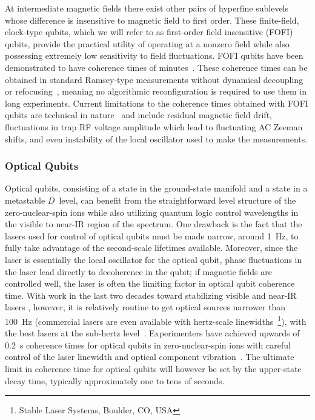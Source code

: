 \documentclass[%
12pt,
 amsmath,amssymb,
]{revtex4-2}
\begin{document}
At intermediate magnetic fields there exist other pairs of hyperfine sublevels whose difference is insensitive to magnetic field to first order.  These finite-field, clock-type qubits, which we will refer to as first-order field insensitive (FOFI) qubits, provide the practical utility of operating at a nonzero field while also possessing extremely low sensitivity to field fluctuations.  FOFI qubits have been demonstrated to have coherence times of minutes~\cite{bollinger_IEEE_550s_ramsey,HartyHighFidelityIons2014}.  These coherence times can be obtained in standard Ramsey-type measurements without dynamical decoupling or refocusing~\cite{PhysRev.80.580,ViolaDynamicDecoup1998}, meaning no algorithmic reconfiguration is required to use them in long experiments.  Current limitations to the coherence times obtained with FOFI qubits are technical in nature~\cite{langer2005long,HartyHighFidelityIons2014} and include residual magnetic field drift, fluctuations in trap RF voltage amplitude which lead to fluctuating AC Zeeman shifts, and even instability of the local oscillator used to make the measurements.


\subsubsection{Optical Qubits}

Optical qubits, consisting of a state in the ground-state manifold and a state in a metastable $D$~level, can benefit from the straightforward level structure of the zero-nuclear-spin ions while also utilizing quantum logic control wavelengths in the visible to near-IR region of the spectrum.  One drawback is the fact that the lasers used for control of optical qubits must be made narrow, around 1~Hz, to fully take advantage of the second-scale lifetimes available.  Moreover, since the laser is essentially the local oscillator for the optical qubit, phase fluctuations in the laser lead directly to decoherence in the qubit; if magnetic fields are controlled well, the laser is often the limiting factor in optical qubit coherence time. With work in the last two decades toward stabilizing visible and near-IR lasers \cite{ZHAOSubHertz2010}, however, it is relatively routine to get optical sources narrower than 100~Hz (commercial lasers are even available with hertz-scale linewidths~\footnote{Stable Laser Systems, Boulder, CO, USA}), with the best lasers at the sub-hertz level~\cite{Kessler2012}.  Experimenters have achieved upwards of 0.2~s coherence times for optical qubits in zero-nuclear-spin ions with careful control of the laser linewidth and optical component vibration~\cite{BermudezAssessing2017}.  The ultimate limit in coherence time for optical qubits will however be set by the upper-state decay time, typically approximately one to tens of seconds.
\end{document}
